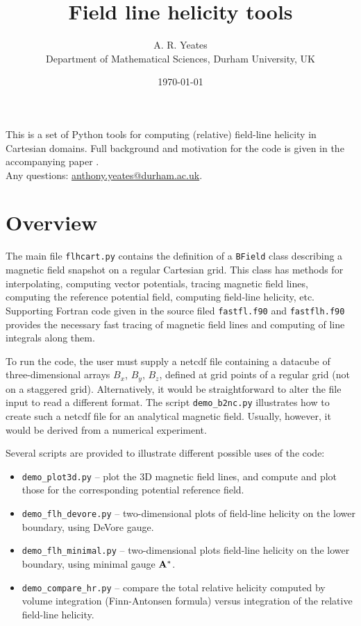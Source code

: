 \documentclass[11pt]{article}
\title{Field line helicity tools}
\author{A. R. Yeates\\ Department of Mathematical Sciences, Durham University, UK}
\date{\today}
\begin{document}
\maketitle

{\abstract This is a set of Python tools for computing (relative) field-line helicity in Cartesian domains. Full background and motivation for the code is given in the accompanying paper \citep{yeates2018}.\\
Any questions: \url{anthony.yeates@durham.ac.uk}.}


\section{Overview}

The main file \texttt{flhcart.py} contains the definition of a \texttt{BField} class describing a magnetic field snapshot on a regular Cartesian grid. This class has methods for interpolating, computing vector potentials, tracing magnetic field lines, computing the reference potential field,  computing field-line helicity, etc. Supporting Fortran code given in the source filed \texttt{fastfl.f90} and \texttt{fastflh.f90} provides the necessary fast tracing of magnetic field lines and computing of line integrals along them.

To run the code, the user must supply a netcdf file containing a datacube of three-dimensional arrays $B_x$, $B_y$, $B_z$, defined at grid points of a regular grid (not on a staggered grid). Alternatively, it would be straightforward to alter the file input to read a different format. The script \texttt{demo\_b2nc.py} illustrates how to create such a netcdf file for an analytical magnetic field. Usually, however, it would be derived from a numerical experiment.

Several scripts are provided to illustrate different possible uses of the code:
\begin{itemize}
\item \texttt{demo\_plot3d.py} -- plot the 3D magnetic field lines, and compute and plot those for the corresponding potential reference field.
\item \texttt{demo\_flh\_devore.py} -- two-dimensional plots of field-line helicity on the lower boundary, using DeVore gauge.
\item \texttt{demo\_flh\_minimal.py} -- two-dimensional plots field-line helicity on the lower boundary, using minimal gauge ${\bf A}^*$.
\item \texttt{demo\_compare\_hr.py} -- compare the total relative helicity computed by volume integration (Finn-Antonsen formula) versus integration of the relative field-line helicity.
\end{itemize}
\end{document}
